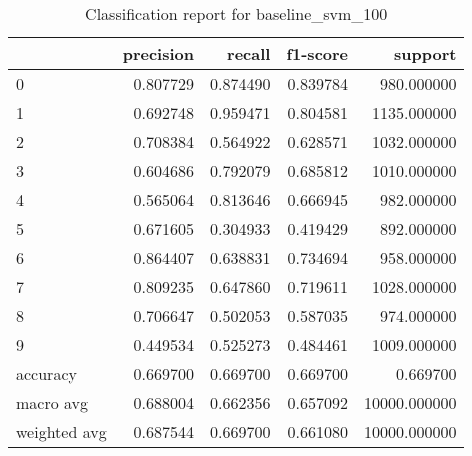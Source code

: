 \begin{table}[htb!]
\centering
\caption{Classification report for baseline_svm_100}
\label{tab:classification-report-baseline_svm_100}
\begin{tabular}{lrrrr}
\toprule
 & precision & recall & f1-score & support \\
\midrule
0 & 0.807729 & 0.874490 & 0.839784 & 980.000000 \\
1 & 0.692748 & 0.959471 & 0.804581 & 1135.000000 \\
2 & 0.708384 & 0.564922 & 0.628571 & 1032.000000 \\
3 & 0.604686 & 0.792079 & 0.685812 & 1010.000000 \\
4 & 0.565064 & 0.813646 & 0.666945 & 982.000000 \\
5 & 0.671605 & 0.304933 & 0.419429 & 892.000000 \\
6 & 0.864407 & 0.638831 & 0.734694 & 958.000000 \\
7 & 0.809235 & 0.647860 & 0.719611 & 1028.000000 \\
8 & 0.706647 & 0.502053 & 0.587035 & 974.000000 \\
9 & 0.449534 & 0.525273 & 0.484461 & 1009.000000 \\
accuracy & 0.669700 & 0.669700 & 0.669700 & 0.669700 \\
macro avg & 0.688004 & 0.662356 & 0.657092 & 10000.000000 \\
weighted avg & 0.687544 & 0.669700 & 0.661080 & 10000.000000 \\
\bottomrule
\end{tabular}
\end{table}
